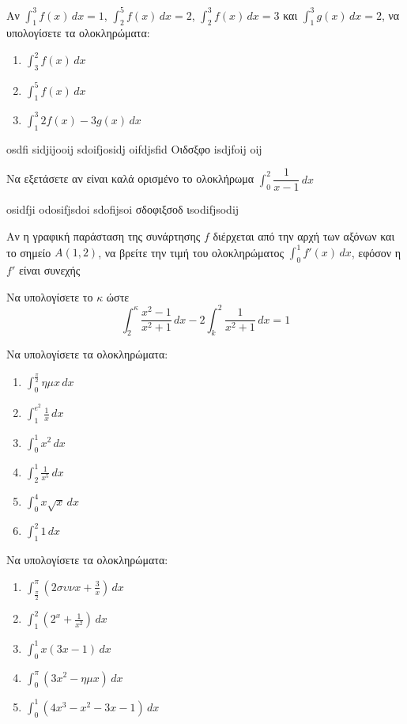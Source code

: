 \documentclass{../presentation}
\begin{document}
\begin{askisi}
  Αν $\int_{1}^{3}f(x)\,dx=1$, $\int_{2}^{5}f(x)\,dx=2$, $\int_{2}^{3}f(x)\,dx=3$ και $\int_{1}^{3}g(x)\,dx=2$, να υπολογίσετε τα ολοκληρώματα:
  \begin{enumerate}[<+->]
    \item $\int_{3}^{2}f(x)\,dx$
    \item $\int_{1}^{5}f(x)\,dx$
    \item $\int_{1}^{3}2f(x)-3g(x)\,dx$
  \end{enumerate}
\end{askisi}osdfi sidjijooij sdoifjosidj oifdjsfid Οιδσξφο isdjfoij oij

\begin{askisi}
  Να εξετάσετε αν είναι καλά ορισμένο το ολοκλήρωμα $\int_{0}^{2}\dfrac{1}{x-1}\, dx$
\end{askisi}
osidfji odosifjsdoi sdofijsoi σδοφιξσοδ ιsodifjsodij
\begin{askisi}
  Αν η γραφική παράσταση της συνάρτησης $f$ διέρχεται από την αρχή των αξόνων και το σημείο $Α(1,2)$, να βρείτε την τιμή του ολοκληρώματος $\int_{0}^{1}f'(x)\,dx$, εφόσον η $f'$ είναι συνεχής
\end{askisi}

\begin{askisi}
  Να υπολογίσετε το $κ$ ώστε
  $$\int_{2}^{κ}\frac{x^2-1}{x^2+1}\, dx-2\int_{k}^{2}\frac{1}{x^2+1}\, dx=1$$
\end{askisi}

\begin{askisi}
  Να υπολογίσετε τα ολοκληρώματα:
  \begin{enumerate}[<+->]
    \item $\int_{0}^{\frac{π}{2}}ημx\,dx$
    \item $\int_{1}^{e^2}\frac{1}{x}\,dx$
    \item $\int_{0}^{1}x^2\,dx$
    \item $\int_{2}^{1}\frac{1}{x^5}\,dx$
    \item $\int_{0}^{4}x\sqrt{x}\,dx$
    \item $\int_{1}^{2}1\,dx$
  \end{enumerate}
\end{askisi}

\begin{askisi}
  Να υπολογίσετε τα ολοκληρώματα:
  \begin{enumerate}[<+->]
    \item $\int_{\frac{π}{2}}^{π}\left( 2συνx+\frac{3}{x} \right)\,dx$
    \item $\int_{1}^{2}\left( 2^x+\frac{1}{x^2} \right)\,dx$
    \item $\int_{0}^{1}x(3x-1)\,dx$
    \item $\int_{0}^{π}(3x^2-ημx)\,dx$
    \item $\int_{0}^{1}(4x^3-x^2-3x-1)\,dx$
  \end{enumerate}
\end{askisi}
\end{document}
